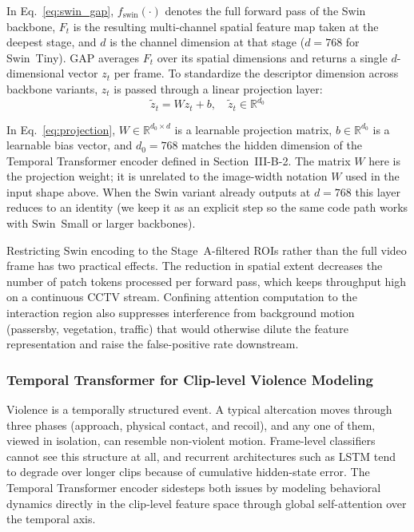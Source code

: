 \documentclass[conference]{IEEEtran}
\begin{document}
\noindent In Eq.~\ref{eq:swin_gap}, $f_{\text{swin}}(\cdot)$ denotes the full forward pass of the Swin backbone, $F_t$ is the resulting multi-channel spatial feature map taken at the deepest stage, and $d$ is the channel dimension at that stage ($d = 768$ for Swin~Tiny). GAP averages $F_t$ over its spatial dimensions and returns a single $d$-dimensional vector $z_t$ per frame. To standardize the descriptor dimension across backbone variants, $z_t$ is passed through a linear projection layer:
\begin{equation}
\tilde{z}_t = Wz_t + b, \quad \tilde{z}_t \in \mathbb{R}^{d_0}
\label{eq:projection}
\end{equation}

\noindent In Eq.~\ref{eq:projection}, $W \in \mathbb{R}^{d_0 \times d}$ is a learnable projection matrix, $b \in \mathbb{R}^{d_0}$ is a learnable bias vector, and $d_0 = 768$ matches the hidden dimension of the Temporal Transformer encoder defined in Section~III-B-2. The matrix $W$ here is the projection weight; it is unrelated to the image-width notation $W$ used in the input shape above. When the Swin variant already outputs at $d = 768$ this layer reduces to an identity (we keep it as an explicit step so the same code path works with Swin~Small or larger backbones).

Restricting Swin encoding to the Stage~A-filtered ROIs rather than the full video frame has two practical effects. The reduction in spatial extent decreases the number of patch tokens processed per forward pass, which keeps throughput high on a continuous CCTV stream. Confining attention computation to the interaction region also suppresses interference from background motion (passersby, vegetation, traffic) that would otherwise dilute the feature representation and raise the false-positive rate downstream.


\subsubsection{Temporal Transformer for Clip-level Violence Modeling}

Violence is a temporally structured event. A typical altercation moves through three phases (approach, physical contact, and recoil), and any one of them, viewed in isolation, can resemble non-violent motion. Frame-level classifiers cannot see this structure at all, and recurrent architectures such as LSTM tend to degrade over longer clips because of cumulative hidden-state error. The Temporal Transformer encoder sidesteps both issues by modeling behavioral dynamics directly in the clip-level feature space through global self-attention over the temporal axis.
\end{document}
